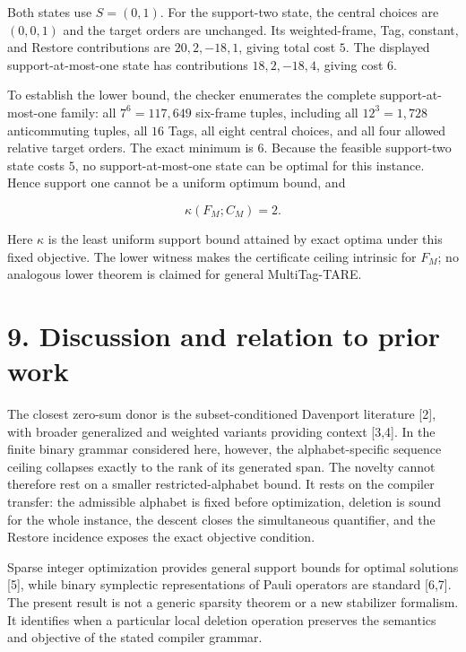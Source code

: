 \documentclass[11pt]{article}
\begin{document}
Both states use \(S=(0,1)\). For the support-two state, the central choices are \((0,0,1)\) and the target orders are unchanged. Its weighted-frame, Tag, constant, and Restore contributions are \(20,2,-18,1\), giving total cost \(5\). The displayed support-at-most-one state has contributions \(18,2,-18,4\), giving cost \(6\).

To establish the lower bound, the checker enumerates the complete support-at-most-one family: all \(7^6=117{,}649\) six-frame tuples, including all \(12^3=1{,}728\) anticommuting tuples, all \(16\) Tags, all eight central choices, and all four allowed relative target orders. The exact minimum is \(6\). Because the feasible support-two state costs \(5\), no support-at-most-one state can be optimal for this instance. Hence support one cannot be a uniform optimum bound, and

\[
\kappa(F_M;C_M)=2.
\]

Here \(\kappa\) is the least uniform support bound attained by exact optima under this fixed objective. The lower witness makes the certificate ceiling intrinsic for \(F_M\); no analogous lower theorem is claimed for general MultiTag-TARE.

\hypertarget{discussion-and-relation-to-prior-work}{%
\section*{9. Discussion and relation to prior work}\label{discussion-and-relation-to-prior-work}}

The closest zero-sum donor is the subset-conditioned Davenport literature {[}2{]}, with broader generalized and weighted variants providing context {[}3,4{]}. In the finite binary grammar considered here, however, the alphabet-specific sequence ceiling collapses exactly to the rank of its generated span. The novelty cannot therefore rest on a smaller restricted-alphabet bound. It rests on the compiler transfer: the admissible alphabet is fixed before optimization, deletion is sound for the whole instance, the descent closes the simultaneous quantifier, and the Restore incidence exposes the exact objective condition.

Sparse integer optimization provides general support bounds for optimal solutions {[}5{]}, while binary symplectic representations of Pauli operators are standard {[}6,7{]}. The present result is not a generic sparsity theorem or a new stabilizer formalism. It identifies when a particular local deletion operation preserves the semantics and objective of the stated compiler grammar.
\end{document}
